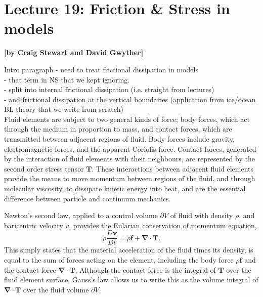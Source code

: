 
\section{Lecture 19: Friction \& Stress in models}
\begin{flushright}\textbf{[by Craig Stewart and David Gwyther]}\end{flushright}

Intro paragraph
- need to treat frictional dissipation in models\\
- that term in NS that we kept ignoring.\\
- split into internal frictional dissipation (i.e. straight from lectures)\\
- and frictional dissipation at the vertical boundaries (application from ice/ocean BL theory that we write from scratch)\\


Fluid elements are subject to two general kinds of force; body forces, which act through the medium in proportion to mass, and contact forces, which are transmitted between adjacent regions of fluid. Body forces include gravity, electromagnetic forces, and the apparent Coriolis force. Contact forces, generated by the interaction of fluid elements with their neighbours, are represented by the second order stress tensor $\boldsymbol{T}$. These interactions between adjacent fluid elements provide the means to move momentum between regions of the fluid, and through molecular viscosity, to dissipate kinetic energy into heat, and are the essential difference between particle and continuum mechanics.  %

Newton's second law, applied to a control volume $\partial V$ of fluid with density $\rho$, and baricentric velocity $v$, provides the Eularian conservation of momentum equation,\\
\begin{equation}
    \rho\frac{D\boldsymbol{v}}{Dt} = \rho\boldsymbol{f} +  \boldsymbol{\nabla}\cdot\boldsymbol{T}.
    \label{L19:GeneralFormMomentum}
\end{equation}
This simply states that the material acceleration of the fluid times its density, is equal to the sum of forces acting on the element, including the body force $\rho \boldsymbol{f}$ and the contact force $\boldsymbol{\nabla}\cdot\boldsymbol{T}$. Although the contact force is the integral of $\boldsymbol{T}$ over the fluid element surface, Gauss's law allows us to write this as the volume integral of $\boldsymbol{\nabla}\cdot\boldsymbol{T}$ over the fluid volume $\partial V$.

